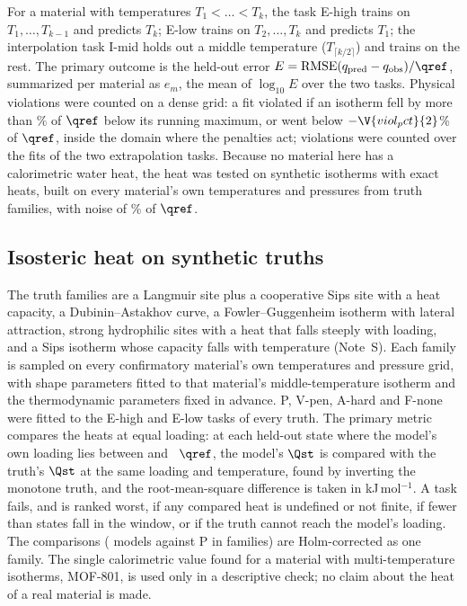 \documentclass[journal=jcisd8,manuscript=article]{achemso}
\begin{document}
For a material with temperatures $T_1 < \dots < T_k$, the task E-high trains on $T_1,\dots,T_{k-1}$ and predicts
$T_k$; E-low trains on $T_2,\dots,T_k$ and predicts $T_1$; the interpolation task I-mid holds out a middle
temperature ($T_{\lceil k/2\rceil}$) and trains on the rest. The primary outcome is the held-out error
$E = \mathrm{RMSE}(q_{\mathrm{pred}} - q_{\mathrm{obs}})/\qref$, summarized per material as $e_m$, the mean of
$\log_{10} E$ over the two tasks. Physical violations were counted on a dense grid: a fit violated if an isotherm
fell by more than \% of $\qref$ below its running maximum, or went below
$-\V{viol_pct}{2}$\% of $\qref$, inside the domain where the penalties act; violations were counted over the fits
of the two extrapolation tasks. Because no material here has a calorimetric water heat, the heat was tested on
synthetic isotherms with exact heats, built on every material's own temperatures and pressures from
 truth families, with noise of \% of $\qref$.

\subsection*{Isosteric heat on synthetic truths}

The  truth families are a Langmuir site plus a cooperative Sips site with a heat capacity, a
Dubinin--Astakhov curve, a Fowler--Guggenheim isotherm with lateral attraction, strong hydrophilic sites with a heat
that falls steeply with loading, and a Sips isotherm whose capacity falls with temperature
(Note~S). Each family is sampled on every confirmatory material's own temperatures and pressure grid, with
shape parameters fitted to that material's middle-temperature isotherm and the thermodynamic parameters fixed in
advance. P, V-pen, A-hard and F-none were fitted to the E-high and E-low tasks of every truth. The primary metric
compares the heats at equal loading: at each held-out state where the model's own loading lies between
 and ~$\qref$, the model's $\Qst$ is compared with the truth's $\Qst$ at the same
loading and temperature, found by inverting the monotone truth, and the root-mean-square difference is taken in
kJ\,mol$^{-1}$. A task fails, and is ranked worst, if any compared heat is undefined or not finite, if fewer than
 states fall in the window, or if the truth cannot reach the model's loading. The
 comparisons ( models against P in 
families) are Holm-corrected as one family. The single calorimetric value found for a material with
multi-temperature isotherms, MOF-801\cite{kim2016}, is used only in a descriptive check; no claim about the heat of
a real material is made.
\end{document}
